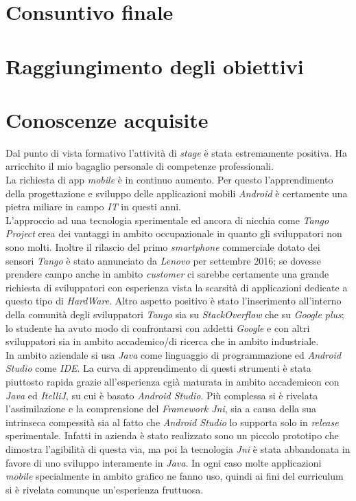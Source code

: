 \section{Consuntivo finale}

\section{Raggiungimento degli obiettivi}

\section{Conoscenze acquisite}
Dal punto di vista formativo l’attività di \emph{stage} è stata estremamente positiva. Ha arricchito il mio bagaglio personale di competenze professionali.\\

La richiesta di app \emph{mobile} è in continuo aumento. Per questo l'apprendimento della progettazione e sviluppo delle applicazioni mobili \emph{Android} è certamente una pietra miliare in campo \emph{IT} in questi anni.\\

L'approccio ad una tecnologia sperimentale ed ancora di nicchia come \emph{Tango Project} crea dei vantaggi in ambito occupazionale in quanto gli sviluppatori non sono molti. Inoltre il rilascio del primo \emph{smartphone} commerciale dotato dei sensori \emph{Tango} è stato annunciato da \emph{Lenovo} per settembre 2016; se dovesse prendere campo anche in ambito \emph{customer} ci sarebbe certamente una grande richiesta di sviluppatori con esperienza vista la scarsità di applicazioni dedicate a questo tipo di \emph{HardWare}. Altro aspetto positivo è stato l'inserimento all'interno della comunità degli sviluppatori \emph{Tango} sia su \emph{StackOverflow} che su \emph{Google plus}; lo studente ha avuto modo di confrontarsi con addetti \emph{Google} e con altri sviluppatori sia in ambito accademico/di ricerca che in ambito industriale.\\

In ambito aziendale si usa \emph{Java} come linguaggio di programmazione ed \emph{Android Studio} come \emph{IDE}. La curva di apprendimento di questi strumenti è stata piuttosto rapida grazie all'esperienza cgià maturata in ambito accademicon con \emph{Java} ed \emph{ItelliJ}, su cui è basato \emph{Android Studio}. Più complessa si è rivelata l'assimilazione e la comprensione del \emph{Framework Jni}, sia a causa della sua intrinseca compessità sia al fatto che \emph{Android Studio} lo supporta solo in \emph{release} sperimentale. Infatti in azienda è stato realizzato sono un piccolo prototipo che dimostra l'agibilità di questa via, ma poi la tecnologia \emph{Jni} è stata abbandonata in favore di uno sviluppo interamente in \emph{Java}. In ogni caso molte applicazioni \emph{mobile} specialmente in ambito grafico ne fanno uso, quindi ai fini del curriculum si è rivelata comunque un'esperienza fruttuosa.


